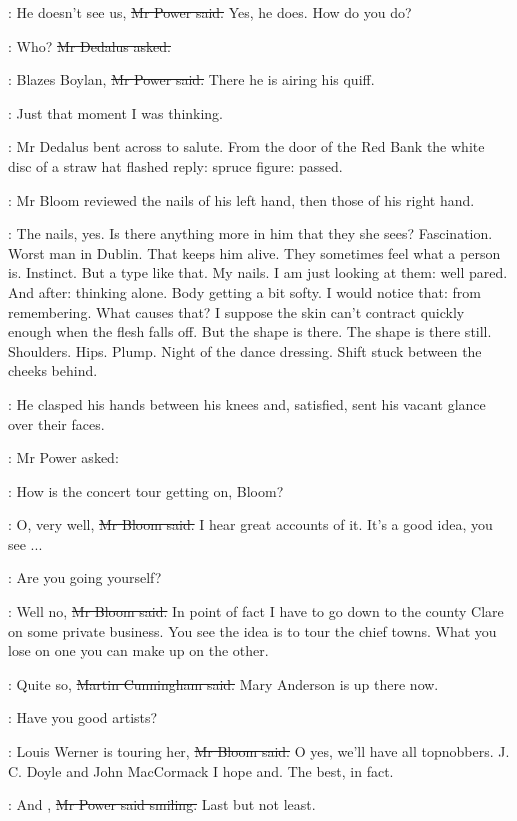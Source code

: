 \power:
He doesn't see us,
\sout{Mr Power said.}
Yes, he does.
How do you do?

\simon:
Who?
\sout{Mr Dedalus asked.}

\power:
Blazes Boylan,
\sout{Mr Power said.}
There he is airing his quiff.

\BloomInt:
Just that moment I was thinking.

:
Mr Dedalus bent across to salute.
From the door of the Red Bank the white disc of a straw hat flashed reply:
spruce figure:
passed.

:
Mr Bloom reviewed the nails of his left hand,
then those of his right hand.

\BloomInt:
The nails, yes.
Is there anything more in him that they she sees?
Fascination.
Worst man in Dublin.
That keeps him alive.
They sometimes feel what a person is.
Instinct.
But a type like that.
My nails.
I am just looking at them:
well pared.
And after:
thinking alone.
Body getting a bit softy.
I would notice that:
from remembering.
What causes that?
I suppose the skin can't contract quickly enough when the flesh falls off.
But the shape is there.
The shape is there still.
Shoulders.
Hips.
Plump.
Night of the dance dressing.
Shift stuck between the cheeks behind.

:
He clasped his hands between his knees
and, satisfied, sent his vacant glance over their faces.

:
Mr Power asked:

\power:
How is the concert tour getting on, Bloom?

\Bloom:
O, very well,
\sout{Mr Bloom said.}
I hear great accounts of it.
It's a good idea, you see ...

\power:
Are you going yourself?

\Bloom:
Well no,
\sout{Mr Bloom said.}
In point of fact
I have to go down to the county Clare on some private business.
You see the idea is to tour the chief towns.
What you lose on one
you can make up on the other.

\cunningham:
Quite so,
\sout{Martin Cunningham said.}
Mary Anderson is up there now.

\power:
Have you good artists?

\Bloom:
Louis Werner is touring her,
\sout{Mr Bloom said.}
O yes, we'll have all topnobbers.
J. C. Doyle and John MacCormack I hope and.
The best, in fact.

\power:
And ,
\sout{Mr Power said smiling.}
Last but not least.

